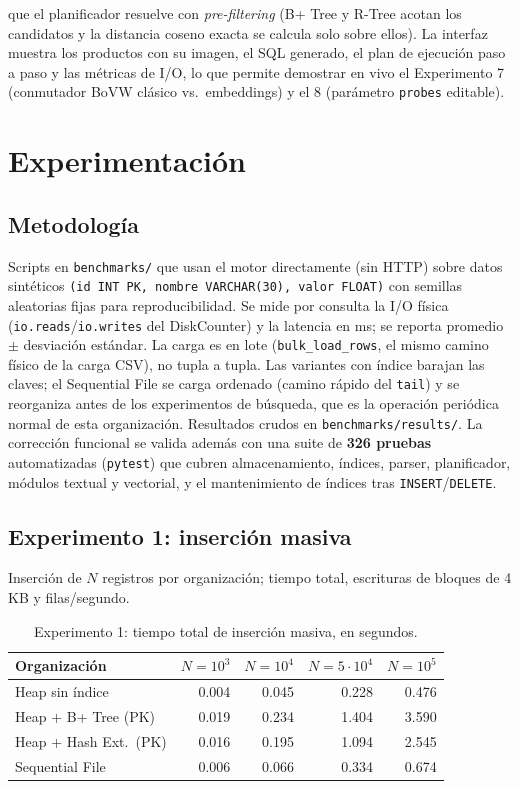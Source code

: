 \documentclass[11pt]{article}
\begin{document}
que el planificador resuelve con \emph{pre-filtering} (B+ Tree y R-Tree
acotan los candidatos y la distancia coseno exacta se calcula solo sobre
ellos). La interfaz muestra los productos con su imagen, el SQL generado,
el plan de ejecución paso a paso y las métricas de I/O, lo que permite
demostrar en vivo el Experimento 7 (conmutador BoVW clásico vs.\
embeddings) y el 8 (parámetro \texttt{probes} editable).

\section{Experimentación}

\subsection{Metodología}

Scripts en \texttt{benchmarks/} que usan el motor directamente (sin HTTP)
sobre datos sintéticos \texttt{(id INT PK, nombre VARCHAR(30), valor FLOAT)}
con semillas aleatorias fijas para reproducibilidad. Se mide por consulta la
I/O física (\texttt{io.reads}/\texttt{io.writes} del DiskCounter) y la
latencia en ms; se reporta promedio $\pm$ desviación estándar. La carga es
en lote (\texttt{bulk\_load\_rows}, el mismo camino físico de la carga CSV),
no tupla a tupla. Las variantes con índice barajan las claves; el Sequential
File se carga ordenado (camino rápido del \texttt{tail}) y se reorganiza
antes de los experimentos de búsqueda, que es la operación periódica normal
de esta organización. Resultados crudos en \texttt{benchmarks/results/}.
La corrección funcional se valida además con una suite de \textbf{326
pruebas} automatizadas (\texttt{pytest}) que cubren almacenamiento,
índices, parser, planificador, módulos textual y vectorial, y el
mantenimiento de índices tras \texttt{INSERT}/\texttt{DELETE}.

\subsection{Experimento 1: inserción masiva}

Inserción de $N$ registros por organización; tiempo total, escrituras de
bloques de 4 KB y filas/segundo.

\begin{table}[!htb]
\centering
\caption{Experimento 1: tiempo total de inserción masiva, en segundos.}
\label{tab:exp1}
\begin{tabular}{@{}lrrrr@{}}
\toprule
\rowcolor{utecblue!10}\textbf{Organización} & $N{=}10^3$ & $N{=}10^4$ & $N{=}5\cdot10^4$ & $N{=}10^5$ \\
\midrule
Heap sin índice      & 0.004 & 0.045 & 0.228 & 0.476 \\
Heap + B+ Tree (PK)  & 0.019 & 0.234 & 1.404 & 3.590 \\
Heap + Hash Ext.\ (PK) & 0.016 & 0.195 & 1.094 & 2.545 \\
Sequential File      & 0.006 & 0.066 & 0.334 & 0.674 \\
\bottomrule
\end{tabular}
\end{table}
\end{document}
